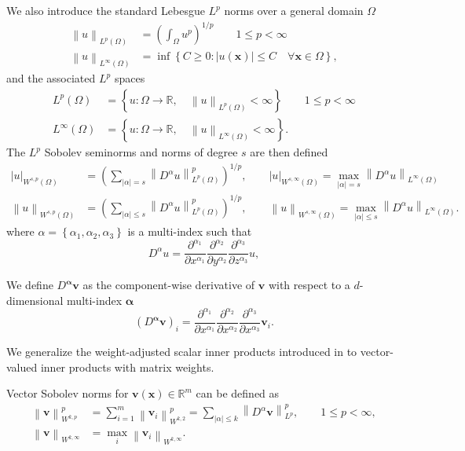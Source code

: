 \documentclass{siamart0216}
\newcommand{\pd}[2]{\frac{\partial#1}{\partial#2}}
\newcommand{\nor}[1]{\left\| #1 \right\|}
\newcommand{\LRp}[1]{\left( #1 \right)}
\newcommand{\LRb}[1]{\left| #1 \right|}
\newcommand{\LRc}[1]{\left\{ #1 \right\}}
\begin{document}
We also introduce the standard Lebesgue $L^p$ norms over a general domain $\Omega$
\begin{align*}
\nor{u}_{L^p\LRp{\Omega}} &= \LRp{\int_{\Omega} u^p}^{1/p} \qquad 1 \leq p < \infty \\
\nor{u}_{L^{\infty}\LRp{\Omega}} &= \inf\LRc{C \geq 0: \LRb{u\LRp{\bm{x}}} \leq C \quad \forall \bm{x}\in \Omega},
\end{align*}
and the associated $L^p$ spaces
\begin{align*}
L^p\LRp{\Omega} &= \LRc{u: \Omega\rightarrow \mathbb{R}, \quad \nor{u}_{L^p\LRp{\Omega}} < \infty} \qquad 1\leq p < \infty \\
L^{\infty}\LRp{\Omega} &= \LRc{u: \Omega\rightarrow \mathbb{R}, \quad \nor{u}_{L^{\infty}\LRp{\Omega}} < \infty}.
\end{align*}
The $L^p$ Sobolev seminorms and norms of degree $s$ are then defined 
\begin{align*}
\LRb{u}_{W^{s,p}\LRp{\Omega}} &= \LRp{\sum_{\LRb{\alpha}= s} \nor{ D^{\alpha} u}_{L^p\LRp{\Omega}}^p}^{1/p}, \qquad \LRb{u}_{W^{s,\infty}\LRp{\Omega}} = \max_{\LRb{\alpha}= s} \nor{D^{\alpha}u}_{L^{\infty}\LRp{\Omega}}\\
\nor{u}_{W^{s,p}\LRp{\Omega}} &= \LRp{\sum_{\LRb{\alpha}\leq s} \nor{ D^{\alpha} u}_{L^p\LRp{\Omega}}^p}^{1/p}, \qquad \nor{u}_{W^{s,\infty}\LRp{\Omega}} = \max_{\LRb{\alpha}\leq s} \nor{D^{\alpha}u}_{L^{\infty}\LRp{\Omega}}.
\end{align*}
where $\alpha = \LRc{\alpha_1,\alpha_2,\alpha_3}$ is a multi-index such that
\[
D^{\alpha}u = \pd{^{\alpha_1}}{x^{\alpha_1}}\pd{^{\alpha_2}}{y^{\alpha_2}}\pd{^{\alpha_3}}{z^{\alpha_3}} u,
\]


We define $D^{\bm{\alpha}}\bm{v}$  as the component-wise derivative of $\bm{v}$ with respect to a $d$-dimensional multi-index $\bm{\alpha}$
\[
\LRp{D^{\bm{\alpha}}\bm{v}}_i = \frac{\partial^{\alpha_1}}{\partial x^{\alpha_1}}\frac{\partial^{\alpha_2}}{\partial x^{\alpha_2}}\frac{\partial^{\alpha_3}}{\partial x^{\alpha_3}}\bm{v}_i.
\]

We generalize the weight-adjusted scalar inner products introduced in \cite{chan2016weight1,chan2016weight2} to vector-valued inner products with matrix weights.  

Vector Sobolev norms for $\bm{v}(\bm{x}) \in \mathbb{R}^m$ can be defined as 
\begin{align*}
\nor{\bm{v}}_{W^{k,p}}^p &= {\sum_{i=1}^m \nor{\bm{v}_i}_{W^{k,2}}^p} = \sum_{\LRb{\alpha} \leq k} \nor{D^{\alpha}\bm{v}}^p_{L^p}, \qquad 1 \leq p < \infty,\\
\nor{\bm{v}}_{W^{k,\infty}} &= \max_i \nor{\bm{v}_i}_{W^{k,\infty}}.
\end{align*}
\end{document}
